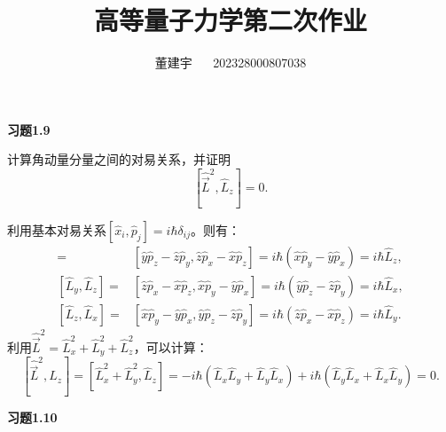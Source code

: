 \documentclass[reqno,a4paper,12pt]{amsart}
\title{高等量子力学第二次作业}
\author{董建宇 ~~ 202328000807038}
\begin{document}
\maketitle
\titleformat{\section}[hang]{\small}{\thesection}{0.8em}{}{}
\titleformat{\subsection}[hang]{\small}{\thesubsection}{0.8em}{}{}

\textbf{习题1.9}

计算角动量分量之间的对易关系，并证明
\[
	[\hat{\vec{L}}^2, \hat{L}_z] = 0.
\]
\begin{tcolorbox}[breakable, colback = black!5!white, colframe = black]
利用基本对易关系$[\hat{x}_i,\hat{p}_j] = i\hbar\delta_{ij}$。则有：
\begin{align*}
	[\hat{L}_x, \hat{L}_y] =& [\hat{y}\hat{p}_z-\hat{z}\hat{p}_y, \hat{z}\hat{p}_x-\hat{x}\hat{p}_z] = i\hbar(\hat{x}\hat{p}_y - \hat{y}\hat{p}_x) = i\hbar\hat{L}_z, \\
	[\hat{L}_y, \hat{L}_z] =& [\hat{z}\hat{p}_x-\hat{x}\hat{p}_z, \hat{x}\hat{p}_y-\hat{y}\hat{p}_x] = i\hbar(\hat{y}\hat{p}_z - \hat{z}\hat{p}_y) = i\hbar\hat{L}_x, \\
	[\hat{L}_z, \hat{L}_x] =& [\hat{x}\hat{p}_y-\hat{y}\hat{p}_x, \hat{y}\hat{p}_z-\hat{z}\hat{p}_y] = i\hbar(\hat{z}\hat{p}_x - \hat{x}\hat{p}_z) = i\hbar\hat{L}_y.
\end{align*}
利用$\hat{\vec{L}}^2 = \hat{L}_x^2 + \hat{L}_y^2 + \hat{L}_z^2$，可以计算：
\[
	[\hat{\vec{L}}^2, \hat{L}_z] = [\hat{L}_x^2 + \hat{L}_y^2, \hat{L}_z] = -i\hbar(\hat{L}_x\hat{L}_y+\hat{L}_y\hat{L}_x) + i\hbar(\hat{L}_y\hat{L}_x+\hat{L}_x\hat{L}_y) = 0.
\]
\end{tcolorbox}

\textbf{习题1.10}
\end{document}
